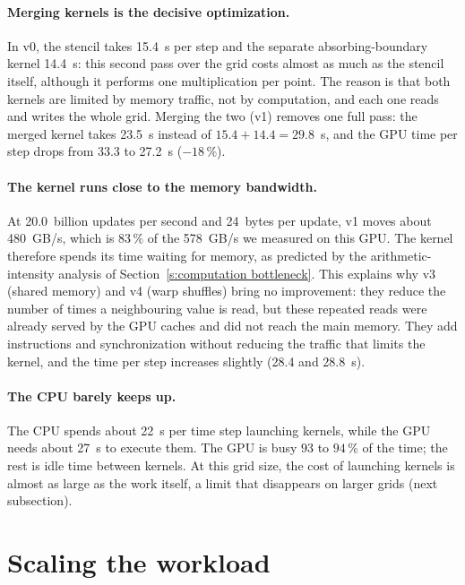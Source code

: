 \documentclass[letterpaper,11pt,leqno]{article}
\begin{document}
\paragraph{Merging kernels is the decisive optimization.}
In v0, the stencil takes 15.4~\textmu s per step and the separate
absorbing-boundary kernel 14.4~\textmu s: this second pass over the grid costs
almost as much as the stencil itself, although it performs one multiplication
per point. The reason is that both kernels are limited by memory traffic, not
by computation, and each one reads and writes the whole grid. Merging the two
(v1) removes one full pass: the merged kernel takes 23.5~\textmu s instead of
$15.4 + 14.4 = 29.8$~\textmu s, and the GPU time per step drops from 33.3 to
27.2~\textmu s ($-18\,\%$).

\paragraph{The kernel runs close to the memory bandwidth.}
At 20.0~billion updates per second and 24~bytes per update, v1 moves about
480~GB/s, which is $83\,\%$ of the 578~GB/s we measured on this GPU. The
kernel therefore spends its time waiting for memory, as predicted by the
arithmetic-intensity analysis of Section~\ref{s:computation bottleneck}. This
explains why v3 (shared memory) and v4 (warp shuffles) bring no improvement:
they reduce the number of times a neighbouring value is read, but these
repeated reads were already served by the GPU caches and did not reach the
main memory. They add instructions and synchronization without reducing the
traffic that limits the kernel, and the time per step increases slightly
(28.4 and 28.8~\textmu s).

\paragraph{The CPU barely keeps up.}
The CPU spends about 22~\textmu s per time step launching kernels, while the
GPU needs about 27~\textmu s to execute them. The GPU is busy $93$ to $94\,\%$
of the time; the rest is idle time between kernels. At this grid size, the
cost of launching kernels is almost as large as the work itself, a limit that
disappears on larger grids (next subsection).

\section{Scaling the workload}\label{s:scaling-section}
\end{document}
